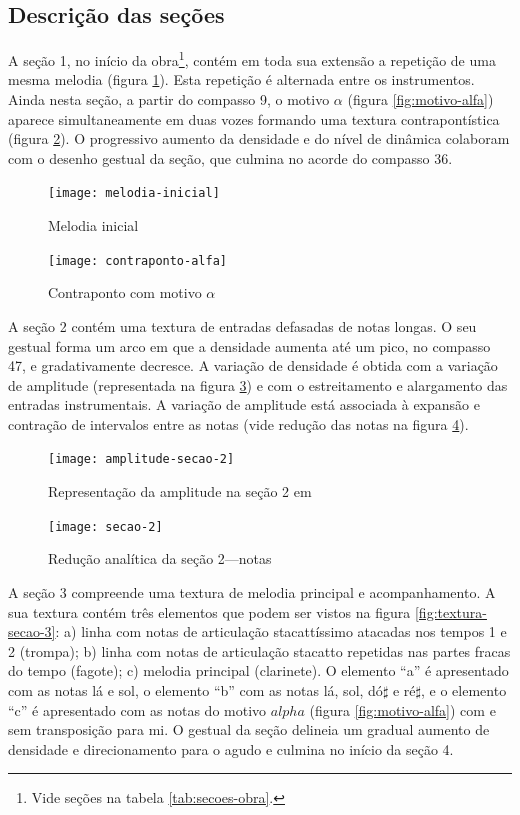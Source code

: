 \subsection{Descrição das seções}
\label{sec:descricao-das-secoes}

A seção 1, no início da obra\footnote{Vide seções na tabela
  \ref{tab:secoes-obra}.}, contém em toda sua extensão a repetição de
uma mesma melodia (figura \ref{fig:melodia-inicial}). Esta repetição é
alternada entre os instrumentos. Ainda nesta seção, a partir do
compasso 9, o motivo $\alpha$ (figura \ref{fig:motivo-alfa}) aparece
simultaneamente em duas vozes formando uma textura contrapontística
(figura \ref{fig:contraponto-alfa}). O progressivo aumento da
densidade e do nível de dinâmica colaboram com o desenho gestual da
seção, que culmina no acorde do compasso 36.

\begin{figure}
  \centering
  \texttt{[image: melodia-inicial]}
  \caption{Melodia inicial}
  \label{fig:melodia-inicial}
\end{figure}

\begin{figure}
  \centering
  \texttt{[image: contraponto-alfa]}
  \caption{Contraponto com motivo $\alpha$}
  \label{fig:contraponto-alfa}
\end{figure}

A seção 2 contém uma textura de entradas defasadas de notas longas. O
seu gestual forma um arco em que a densidade aumenta até um pico, no
compasso 47, e gradativamente decresce. A variação de densidade é
obtida com a variação de amplitude (representada na figura
\ref{fig:amplitude-secao-2}) e com o estreitamento e alargamento das
entradas instrumentais. A variação de amplitude está associada à
expansão e contração de intervalos entre as notas (vide redução das
notas na figura \ref{fig:notas-secao-2}).

\begin{figure}
  \centering
  \texttt{[image: amplitude-secao-2]}
  \caption{Representação da amplitude na seção 2 em }
  \label{fig:amplitude-secao-2}
\end{figure}

\begin{figure}
  \centering
  \texttt{[image: secao-2]}
  \caption{Redução analítica da seção 2---notas}
  \label{fig:notas-secao-2}
\end{figure}

A seção 3 compreende uma textura de melodia principal e
acompanhamento. A sua textura contém três elementos que podem ser
vistos na figura \ref{fig:textura-secao-3}: a) linha com notas de
articulação stacattíssimo atacadas nos tempos 1 e 2 (trompa); b) linha
com notas de articulação stacatto repetidas nas partes fracas do tempo
(fagote); c) melodia principal (clarinete). O elemento ``a'' é
apresentado com as notas lá e sol, o elemento ``b'' com as notas lá,
sol, dó$\sharp$ e ré$\sharp$, e o elemento ``c'' é apresentado com as
notas do motivo $alpha$ (figura \ref{fig:motivo-alfa}) com e sem
transposição para mi. O gestual da seção delineia um gradual aumento
de densidade e direcionamento para o agudo e culmina no início da
seção 4.

